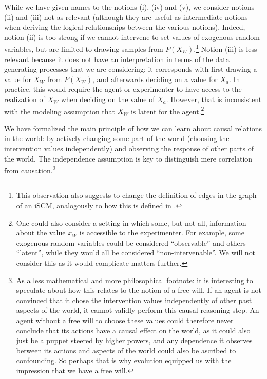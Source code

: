 While we have given names to the notions (i), (iv) and (v), we consider notions (ii) and (iii) not as relevant (although they are useful as intermediate notions when deriving the logical relationships between the various notions).
Indeed, notion (ii) is too strong if we cannot intervene to set values of exogenous random variables, but are limited to drawing samples from $P(X_W)$.\footnote{This observation also suggests to change the definition of edges in the graph of an iSCM, analogously to how this is defined in \cite{BFPM21}. }
Notion (iii) is less relevant because it does not have an interpretation in terms of the data generating processes that we are considering:
it corresponds with first drawing a value for $X_W$ from $P(X_W)$, and afterwards deciding on a value for $X_a$. 
In practice, this would require the agent or experimenter to have access to the realization of $X_W$ when deciding on the value of $X_a$.
However, that is inconsistent with the modeling assumption that $X_W$ is latent for the agent.\footnote{One could also consider a setting in
which some, but not all, information about the value $x_W$ is accessible to the experimenter. For example, some exogenous random variables
could be considered ``observable'' and others ``latent'', while they would all be considered ``non-intervenable''. We will not consider this as 
it would complicate matters further.}


We have formalized the main principle of how we can learn about causal relations in the world: by actively changing some part of the world (choosing the intervention values independently) and observing the response of other parts of the world.
The independence assumption is key to distinguish mere correlation from causation.\footnote{As a less mathematical and more philosophical footnote: it is interesting to speculate about how this relates to the notion of a free will. 
If an agent is not convinced that it chose the intervention values independently of other past aspects of the world, it cannot validly perform this causal reasoning step. 
An agent without a free will to choose these values could therefore never conclude that its actions have a causal effect on the world, as it could also just be a puppet steered by higher powers, and any dependence it observes between its actions and aspects of the world could also be ascribed to confounding. 
So perhaps that is why evolution equipped us with the impression that we have a free will.}

